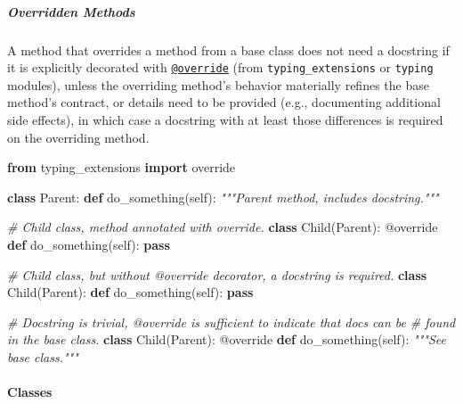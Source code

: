 \documentclass[
]{article}
\newenvironment{Shaded}{}{}
\newcommand{\AttributeTok}[1]{\textcolor[rgb]{0.49,0.56,0.16}{#1}}
\newcommand{\CommentTok}[1]{\textcolor[rgb]{0.38,0.63,0.69}{\textit{#1}}}
\newcommand{\ControlFlowTok}[1]{\textcolor[rgb]{0.00,0.44,0.13}{\textbf{#1}}}
\newcommand{\ImportTok}[1]{\textcolor[rgb]{0.00,0.50,0.00}{\textbf{#1}}}
\newcommand{\KeywordTok}[1]{\textcolor[rgb]{0.00,0.44,0.13}{\textbf{#1}}}
\newcommand{\NormalTok}[1]{#1}
\newcommand{\VariableTok}[1]{\textcolor[rgb]{0.10,0.09,0.49}{#1}}
\begin{document}
\subparagraph{Overridden Methods}

A method that overrides a method from a base class does not need a
docstring if it is explicitly decorated with
\href{https://typing-extensions.readthedocs.io/en/latest/\#override}{\texttt{@override}}
(from \texttt{typing\_extensions} or \texttt{typing} modules), unless
the overriding method's behavior materially refines the base method's
contract, or details need to be provided (e.g., documenting additional
side effects), in which case a docstring with at least those differences
is required on the overriding method.

\begin{samepage}
\begin{Shaded}
\begin{Highlighting}[]
\ImportTok{from}\NormalTok{ typing\_extensions }\ImportTok{import}\NormalTok{ override}

\KeywordTok{class}\NormalTok{ Parent:}
  \KeywordTok{def}\NormalTok{ do\_something(}\VariableTok{self}\NormalTok{):}
    \CommentTok{"""Parent method, includes docstring."""}

\CommentTok{\# Child class, method annotated with override.}
\KeywordTok{class}\NormalTok{ Child(Parent):}
  \AttributeTok{@override}
  \KeywordTok{def}\NormalTok{ do\_something(}\VariableTok{self}\NormalTok{):}
    \ControlFlowTok{pass}
\end{Highlighting}
\end{Shaded}
\end{samepage}

\begin{samepage}
\begin{Shaded}
\begin{Highlighting}[]
\CommentTok{\# Child class, but without @override decorator, a docstring is required.}
\KeywordTok{class}\NormalTok{ Child(Parent):}
  \KeywordTok{def}\NormalTok{ do\_something(}\VariableTok{self}\NormalTok{):}
    \ControlFlowTok{pass}

\CommentTok{\# Docstring is trivial, @override is sufficient to indicate that docs can be}
\CommentTok{\# found in the base class.}
\KeywordTok{class}\NormalTok{ Child(Parent):}
  \AttributeTok{@override}
  \KeywordTok{def}\NormalTok{ do\_something(}\VariableTok{self}\NormalTok{):}
    \CommentTok{"""See base class."""}
\end{Highlighting}
\end{Shaded}
\end{samepage}

\paragraph{Classes}
\end{document}
